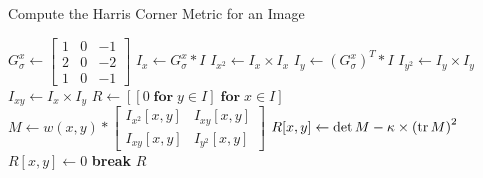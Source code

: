 \begin{answer}
  \begin{algorithm}[H]
    \caption{Compute the Harris Corner Metric for an Image}\label{alg:harris-metric}
    \begin{algorithmic}
        \State
        \State $G_\sigma^x \gets \begin{bmatrix} 1 & 0 & -1 \\ 2 & 0 & -2 \\ 1 & 0 & -1 \end{bmatrix}$ 
        \State
        \State $I_x \gets G_\sigma^x \ast I$
        \State $I_{x^2} \gets I_x \times I_x$
        \State $I_y \gets {(G_\sigma^x)}^T \ast I$
        \State $I_{y^2} \gets I_y \times I_y$
        \State $I_{xy} \gets I_x \times I_y$
        \State $R \gets [[0\; \mathbf{for}\;  y \in I]\; \mathbf{for}\; x \in I]$ 
            \State
            \State $M \gets w(x, y) \ast \begin{bmatrix} I_{x^2}[x,y] & I_{xy}[x,y] \\ I_{xy}[x,y] & I_{y^2}[x,y] \end{bmatrix}$ 
            \State
            \State $R[x,y] \gets \det M - \kappa \times {(\operatorname{tr}M)}^2$ 
          \EndFor
        \EndFor
                \State $R[x,y] \gets 0$ 
                \State \textbf{break}
              \EndIf
            \EndFor
          \EndFor
        \EndFor
        \State \Return $R$
      \EndProcedure
    \end{algorithmic}
  \end{algorithm}
      
\end{answer}
